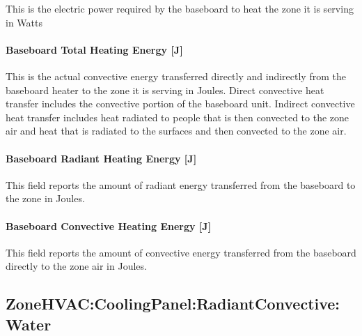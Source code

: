 This is the electric power required by the baseboard to heat the zone it is serving in Watts

\paragraph{Baseboard Total Heating Energy {[}J{]}}\label{baseboard-total-heating-energy-j-2}

This is the actual convective energy transferred directly and indirectly from the baseboard heater to the zone it is serving in Joules. Direct convective heat transfer includes the convective portion of the baseboard unit. Indirect convective heat transfer includes heat radiated to people that is then convected to the zone air and heat that is radiated to the surfaces and then convected to the zone air.

\paragraph{Baseboard Radiant Heating Energy {[}J{]}}\label{baseboard-radiant-heating-energy-j-2}

This field reports the amount of radiant energy transferred from the baseboard to the zone in Joules.

\paragraph{Baseboard Convective Heating Energy {[}J{]}}\label{baseboard-convective-heating-energy-j-2}

This field reports the amount of convective energy transferred from the baseboard directly to the zone air in Joules.

\subsection{ZoneHVAC:CoolingPanel:RadiantConvective:Water}\label{zonehvaccoolingpanelradiantconvectivewater}

